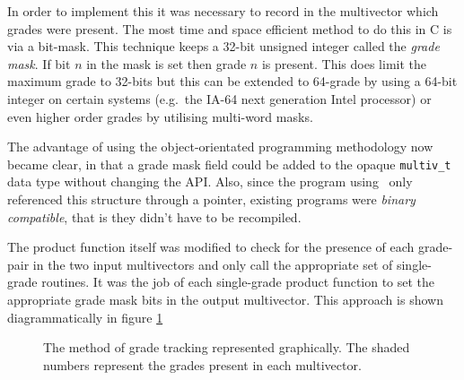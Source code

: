 In order to implement this it was necessary to record in the multivector which
grades were present. The most time and space efficient method to do this in
C is via a bit-mask. This technique keeps a 32-bit unsigned integer called the
\emph{grade mask}. If bit $n$ in the mask is set then grade $n$ is present. 
This does limit the maximum grade to 32-bits but this can be extended to 64-grade
by using a 64-bit integer on certain systems (e.g.\ the IA-64 next generation
Intel processor) or even higher order grades by utilising multi-word masks.

The advantage of using the object-orientated programming methodology now
became clear, in that a grade mask field could be added to the opaque
\texttt{multiv\_t} data type without changing the API. Also, since the 
program using \libcga\ only referenced this structure through a pointer,
existing programs were \emph{binary compatible}, that is they didn't have to be
recompiled.

The product function itself was modified to check for the presence of each 
grade-pair in the two input multivectors and only call the appropriate 
set of single-grade routines. It was the job of each single-grade
product function to set the appropriate grade mask bits in the output multivector.
This approach is shown diagrammatically in figure \ref{fig:parallel}

\begin{figure}
\centering
{}
\caption{The method of grade tracking represented graphically. The shaded
numbers represent the grades present in each multivector.\label{fig:parallel}}
\end{figure}

% 
% 
% 
% 
% 
% 
% 

